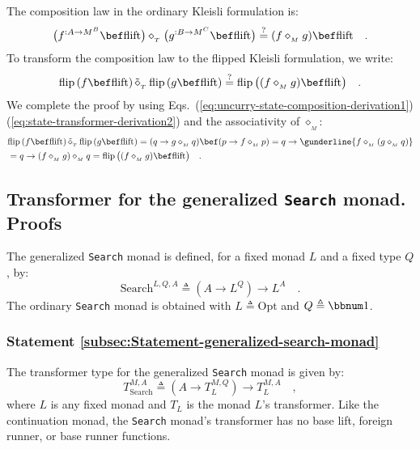 The composition law in the ordinary Kleisli formulation is:
\[
\big(f^{:A\rightarrow M^{B}}\bef\text{flift}\big)\diamond_{_{T}}\big(g^{:B\rightarrow M^{C}}\bef\text{flift}\big)\overset{?}{=}(f\diamond_{_{M}}g)\bef\text{flift}\quad.
\]
To transform the composition law to the flipped Kleisli formulation,
we write:
\[
\text{flip}\,(f\bef\text{flift})\,\tilde{\diamond}_{_{T}}\,\text{flip}\,(g\bef\text{flift})\overset{?}{=}\text{flip}\,\big((f\diamond_{_{M}}g)\bef\text{flift}\big)\quad.
\]
We complete the proof by using Eqs.~(\ref{eq:uncurry-state-composition-derivation1})\textendash (\ref{eq:state-transformer-derivation2})
and the associativity of $\diamond_{_{M}}$:
\begin{align*}
 & \text{flip}\,(f\bef\text{flift})\,\tilde{\diamond}_{_{T}}\,\text{flip}\,(g\bef\text{flift})=(q\rightarrow g\diamond_{_{M}}q)\bef(p\rightarrow f\diamond_{_{M}}p)=q\rightarrow\gunderline{f\diamond_{_{M}}(g\diamond_{_{M}}q)}\\
 & =q\rightarrow(f\diamond_{_{M}}g)\diamond_{_{M}}q=\text{flip}\,\big((f\diamond_{_{M}}g)\bef\text{flift}\big)\quad.
\end{align*}


\subsection{Transformer for the generalized \texttt{Search} monad. Proofs\label{subsec:Transformer-for-the-generalized-search-monad}}

The generalized
\lstinline!Search! monad is defined, for a fixed monad $L$ and a
fixed type $Q$, by:
\[
\text{Search}^{L,Q,A}\triangleq(A\rightarrow L^{Q})\rightarrow L^{A}\quad.
\]
The ordinary \lstinline!Search! monad is obtained with $L\triangleq\text{Opt}$
and $Q\triangleq\bbnum 1$.

\subsubsection{Statement \label{subsec:Statement-generalized-search-monad}\ref{subsec:Statement-generalized-search-monad}}

The transformer type for the generalized \lstinline!Search! monad
is given by:
\[
T_{\text{Search}}^{M,A}\triangleq(A\rightarrow T_{L}^{M,Q})\rightarrow T_{L}^{M,A}\quad,
\]
where $L$ is any fixed monad and $T_{L}$ is the monad $L$\textsf{'}s transformer.
Like the continuation monad, the \lstinline!Search! monad\textsf{'}s transformer
has no base lift, foreign runner, or base runner functions.

